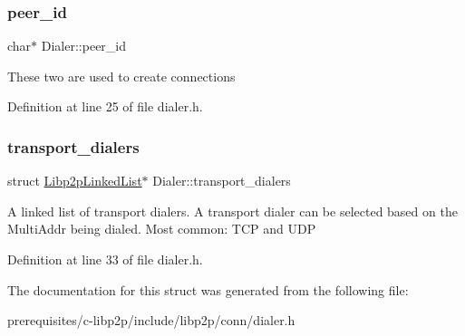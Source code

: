 \subsubsection{\texorpdfstring{peer\+\_\+id}{peer\_id}}
{\footnotesize\ttfamily char$\ast$ Dialer\+::peer\+\_\+id}

These two are used to create connections 

Definition at line 25 of file dialer.\+h.

\mbox{\label{struct_dialer_af12449c90dc5db2d516e4e1275dfdcae}} 
\subsubsection{\texorpdfstring{transport\+\_\+dialers}{transport\_dialers}}
{\footnotesize\ttfamily struct \mbox{\hyperlink{struct_libp2p_linked_list}{Libp2p\+Linked\+List}}$\ast$ Dialer\+::transport\+\_\+dialers}

A linked list of transport dialers. A transport dialer can be selected based on the Multi\+Addr being dialed. Most common\+: T\+CP and U\+DP 

Definition at line 33 of file dialer.\+h.



The documentation for this struct was generated from the following file\+:\begin{DoxyCompactItemize}
\item 
prerequisites/c-\/libp2p/include/libp2p/conn/dialer.\+h\end{DoxyCompactItemize}
